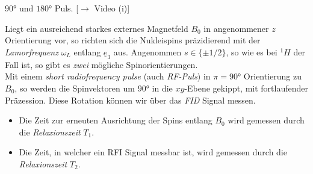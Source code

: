 \documentclass{subfiles}
\begin{document}
    \begin{Frage}
        $90\si\degree$ und $180\si\degree$ Puls. [$\to$ Video (i)]
    \end{Frage}
    \begin{Antwort}
        Liegt ein ausreichend starkes externes Magnetfeld $B_0$ in angenommener $z$ Orientierung vor, so richten sich die Nukleispins präzidierend mit der \emph{Lamorfrequenz} $\omega_L$ entlang $\underline e_3$ aus. Angenommen $s\in\{\pm 1/2\}$, so wie es bei $^1H$ der Fall ist, so gibt es \emph{zwei} mögliche Spinorientierungen. \\

        Mit einem \emph{short radiofrequency pulse} (auch \emph{RF-Puls}) in $\pi = 90\si\degree$ Orientierung zu $B_0$, so werden die Spinvektoren um $90\si\degree$ in die $xy$-Ebene gekippt, mit fortlaufender Präzession. Diese Rotation können wir über das \emph{FID} Signal messen.

        \begin{figure}[H]
            \centering
        \end{figure}
        \begin{itemize}[label=$\to$]
            \item Die Zeit zur erneuten Ausrichtung der Spins entlang $B_0$ wird gemessen durch die \emph{Relaxionszeit} $T_1$.
            \item Die Zeit, in welcher ein RFI Signal messbar ist, wird gemessen durch die \emph{Relaxionszeit} $T_2$.
        \end{itemize}
    \end{Antwort}
\end{document}
